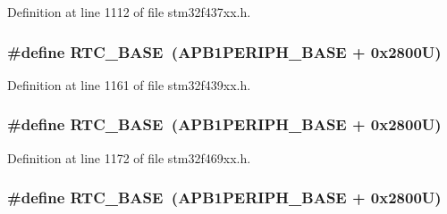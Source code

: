Definition at line 1112 of file stm32f437xx.\+h.

\subsubsection[{\texorpdfstring{R\+T\+C\+\_\+\+B\+A\+SE}{RTC_BASE}}]{\setlength{\rightskip}{0pt plus 5cm}\#define R\+T\+C\+\_\+\+B\+A\+SE~({\bf A\+P\+B1\+P\+E\+R\+I\+P\+H\+\_\+\+B\+A\+SE} + 0x2800\+U)}\hypertarget{group___peripheral__memory__map_ga4265e665d56225412e57a61d87417022}{}\label{group___peripheral__memory__map_ga4265e665d56225412e57a61d87417022}


Definition at line 1161 of file stm32f439xx.\+h.

\subsubsection[{\texorpdfstring{R\+T\+C\+\_\+\+B\+A\+SE}{RTC_BASE}}]{\setlength{\rightskip}{0pt plus 5cm}\#define R\+T\+C\+\_\+\+B\+A\+SE~({\bf A\+P\+B1\+P\+E\+R\+I\+P\+H\+\_\+\+B\+A\+SE} + 0x2800\+U)}\hypertarget{group___peripheral__memory__map_ga4265e665d56225412e57a61d87417022}{}\label{group___peripheral__memory__map_ga4265e665d56225412e57a61d87417022}


Definition at line 1172 of file stm32f469xx.\+h.

\subsubsection[{\texorpdfstring{R\+T\+C\+\_\+\+B\+A\+SE}{RTC_BASE}}]{\setlength{\rightskip}{0pt plus 5cm}\#define R\+T\+C\+\_\+\+B\+A\+SE~({\bf A\+P\+B1\+P\+E\+R\+I\+P\+H\+\_\+\+B\+A\+SE} + 0x2800\+U)}\hypertarget{group___peripheral__memory__map_ga4265e665d56225412e57a61d87417022}{}\label{group___peripheral__memory__map_ga4265e665d56225412e57a61d87417022}


